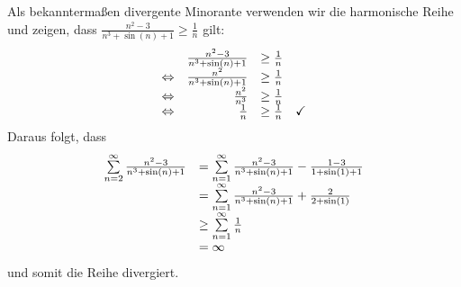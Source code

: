\documentclass[main.tex]{subfiles}
\begin{document}
Als bekanntermaßen divergente Minorante verwenden wir die harmonische Reihe und zeigen, dass $\frac{n^{2} -3}{n^{3} +\sin( n) +1} \geq \frac{1}{n}$ gilt:
\begin{equation*}
\begin{array}{ c r l c }
 & \frac{n^{2} -3}{n^{3} +\sin( n) +1} & \geq \frac{1}{n} & \\
\Leftrightarrow  & \frac{n^{2}}{n^{3} +\sin( n) +1} & \geq \frac{1}{n} & \\
\Leftrightarrow  & \frac{n^{2}}{n^{3}} & \geq \frac{1}{n} & \\
\Leftrightarrow  & \frac{1}{n} & \geq \frac{1}{n} & \checkmark
\end{array}
\end{equation*}
Daraus folgt, dass
\begin{equation*}
\begin{array}{ c l }
\sum\limits _{n=2}^{\infty }\frac{n^{2} -3}{n^{3} +\sin( n) +1} & =\sum\limits _{n=1}^{\infty }\frac{n^{2} -3}{n^{3} +\sin( n) +1} -\frac{1-3}{1+\sin( 1) +1}\\
 & =\sum\limits _{n=1}^{\infty }\frac{n^{2} -3}{n^{3} +\sin( n) +1} +\frac{2}{2+\sin( 1)}\\
 & \geq \sum\limits _{n=1}^{\infty }\frac{1}{n}\\
 & =\infty
\end{array}
\end{equation*}
und somit die Reihe divergiert.
\end{document}
